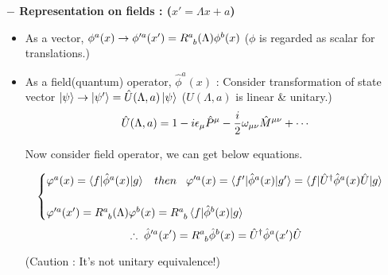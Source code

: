 \documentclass[11pt,letterpaper]{article}
\begin{document}
\VS

{\bfseries $-$ Representation on fields : ($x'=\Lambda x + a$)}

\vs

\begin{itemize}
	\item As a vector, $\phi^a(x)\rightarrow \phi'^a(x') = \tensor{R}{^a _b}(\Lambda) \phi^{b} (x)$ \quad ($\phi$ is regarded as scalar for translations.)
	\item As a field(quantum) operator, $\hat{\phi}^a(x)$ \newline
	: Consider transformation of state vector $\ket{\psi}\rightarrow\ket{\psi'}=\hat{U}(\Lambda, a)\ket{\psi}$ \quad ($\hat{U}(\Lambda, a)$ is linear \& unitary.) \newline
	$$\hat{U}(\Lambda,a) = 1-i\epsilon_\mu \hat{P}^{\mu} -\frac{i}{2}\omega_{\mu\nu}\hat{M}^{\mu\nu}+\cdots$$
	
	\vs
	
	Now consider field operator, we can get below equations.
	
	$$
	\begin{cases}
		\varphi^a(x) = \braket{f|\hat{\phi}^a(x)|g} \HS then \HS 
			\varphi'^a(x) = \braket{f'|\hat{\phi}^a(x)|g'} =\braket{f|\hat{U}^\dagger \hat{\phi}^a(x)\hat{U}|g}\\
			\\
		\varphi'^a(x') = \tensor{R}{^a_b}(\Lambda)\varphi^b(x) = \tensor{R}{^a_b}\braket{f|\hat{\phi}^b(x)|g}
	\end{cases}
	$$ \newline
	$$\therefore \hs \hat{\phi}'^a(x') =  \tensor{R}{^a_b}\hat{\phi}^b(x) = \hat{U}^\dagger \hat{\phi}^a(x')\hat{U}$$
	\begin{center}
		(Caution : It's not unitary equivalence!)
	\end{center}
	
\end{itemize}
  
\end{document}

